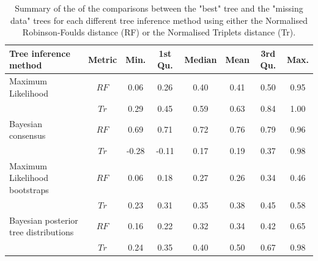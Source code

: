 \begin{landscape}
\begin{table}[ht]
\caption{Summary of the of the comparisons between the "best" tree and the "missing data" trees for each different tree inference method using either the Normalised Robinson-Foulds distance (RF) or the Normalised Triplets distance (Tr).}
\label{Tab_Supp_summary_metric_allparam}
\centering
\begin{tabular}{lccccccc}
  \hline
 Tree inference method & Metric & Min. & 1st Qu. & Median & Mean & 3rd Qu. & Max. \\ 
  \hline
  Maximum Likelihood                    & $RF$ & 0.06 & 0.26 & 0.40 & 0.41 & 0.50 & 0.95 \\ 
                                        & $Tr$ & 0.29 & 0.45 & 0.59 & 0.63 & 0.84 & 1.00 \\ 
  Bayesian consensus                    & $RF$ & 0.69 & 0.71 & 0.72 & 0.76 & 0.79 & 0.96 \\ 
                                        & $Tr$ & -0.28 & -0.11 & 0.17 & 0.19 & 0.37 & 0.98 \\ 
  Maximum Likelihood bootstraps         & $RF$ & 0.06 & 0.18 & 0.27 & 0.26 & 0.34 & 0.46 \\ 
                                        & $Tr$ & 0.23 & 0.31 & 0.35 & 0.38 & 0.45 & 0.58 \\ 
  Bayesian posterior tree distributions & $RF$ & 0.16 & 0.22 & 0.32 & 0.34 & 0.42 & 0.65 \\ 
                                        & $Tr$ & 0.24 & 0.35 & 0.40 & 0.50 & 0.67 & 0.98 \\ 
   \hline
\end{tabular}
\end{table}
\end{landscape}



